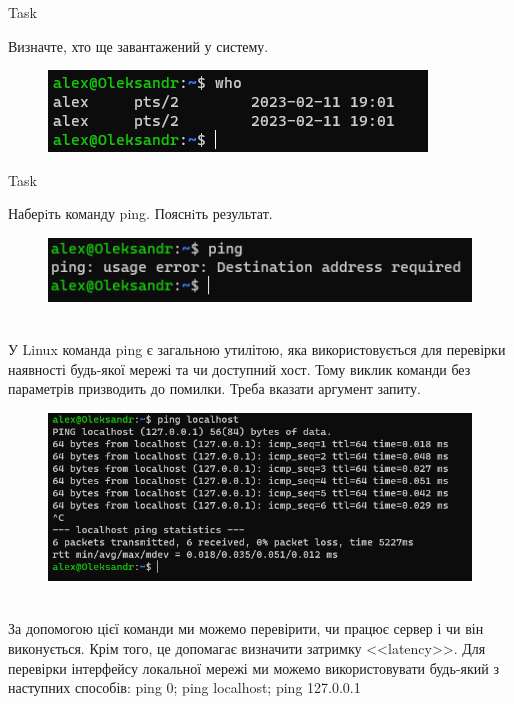 \documentclass[a4paper,12pt]{article}
\newcommand{\RomanNumeralCaps}[1]{\MakeUppercase{\romannumeral #1}}
\begin{document}
\newpage
    \begin{center}
        \Large{Task \RomanNumeralCaps{8}}
    \end{center}
    Визначте, хто ще завантажений у систему.
    \begin{figure}[h!]
        \begin{minipage}[h]{1\linewidth}
            \centering
            \includegraphics[width=0.5\linewidth]{Prt sc/Figure_8.png}  
        \end{minipage}
    \end{figure}
    
    \begin{center}
        \Large{Task \RomanNumeralCaps{9}}
    \end{center}
    Наберiть команду ping. Пояснiть результат.
    \begin{figure}[h!]
        \begin{minipage}[h]{1\linewidth}
            \centering
            \includegraphics[width=0.8\linewidth]{Prt sc/Figure_9_2.png}  
        \end{minipage}
    \end{figure} \\ 
    У Linux команда ping є загальною утилітою, яка використовується для перевірки 
    наявності будь-якої мережі та чи доступний хост. Тому виклик команди без параметрів
    призводить до помилки. Треба вказати аргумент запиту. 
    \begin{figure}[h!]
        \begin{minipage}[h]{1\linewidth}
            \centering
            \includegraphics[width=0.8\linewidth]{Prt sc/Figure_9.png}  
        \end{minipage}
    \end{figure} \\
    За допомогою цієї команди ми можемо перевірити, чи працює сервер і чи він виконується. 
    Крім того, це допомагає визначити затримку <<latency>>.
    Для перевірки інтерфейсу локальної мережі ми можемо використовувати будь-який з наступних способів:
    ping 0; ping localhost; ping 127.0.0.1
\end{document}
